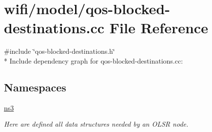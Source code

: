 \hypertarget{qos-blocked-destinations_8cc}{}\section{wifi/model/qos-\/blocked-\/destinations.cc File Reference}
\label{qos-blocked-destinations_8cc}
{\ttfamily \#include \char`\"{}qos-\/blocked-\/destinations.\+h\char`\"{}}\\*
Include dependency graph for qos-\/blocked-\/destinations.cc\+:
\subsection*{Namespaces}
\begin{DoxyCompactItemize}
\item 
 \hyperlink{namespacens3}{ns3}
\begin{DoxyCompactList}\small\item\em Here are defined all data structures needed by an O\+L\+SR node. \end{DoxyCompactList}\end{DoxyCompactItemize}
